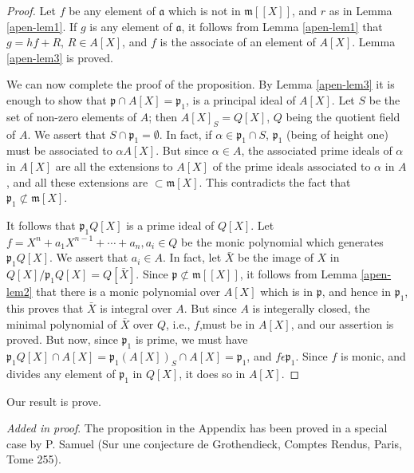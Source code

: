 \begin{proof}
Let $f$ be any element of $\mathfrak{a}$ which is not in $\mathfrak{m} [[X]]$, and $r$ as in Lemma \ref{apen-lem1}. If $g$ is any element of $\mathfrak{a}$, it follows from Lemma \ref{apen-lem1} that $g = hf+R$, $R \in A [X]$, and $f$ is the associate of an element of $A[X]$. Lemma \ref{apen-lem3} is proved.

We can now complete the proof of the proposition. By Lemma \ref{apen-lem3} it is enough to show that $\mathfrak{p} \cap A [X] = \mathfrak{p}_1$, is a principal ideal of $A[X]$. Let $S$ be the set of non-zero elements of $A$; then $A [X]_S = Q [X]$, $Q$ being the quotient field of $A$. We assert that $S \cap \mathfrak{p}_1 = \emptyset$. In fact, if $\alpha\in \mathfrak{p}_1 \cap S$, $\mathfrak{p}_1$ (being of height one) must be associated to $\alpha A [X]$. But since $\alpha \in A$, the associated prime ideals of $\alpha$ in $A [X]$ are all the extensions to $A[X]$ of the prime ideals associated to $\alpha$ in $A$, and all these extensions are $\subset \mathfrak{m}[X]$. This contradicts the fact that $\mathfrak{p}_1 \not\subset \mathfrak{m}[X]$. 

It follows that $\mathfrak{p}_1 Q [X]$ is a prime ideal of $Q[X]$. Let $f= X^n + a_1 X^{n-1} + \cdots + a_n, a_i \in Q$ be the monic polynomial which generates $\mathfrak{p}_1 Q [X]$. We assert that $a_i \in A$. In fact, let $\bar{X}$ be the image of $X$ in $Q [X]/ \mathfrak{p}_1 Q [X] = Q [\bar{X}]$. Since $\mathfrak{p} \not\subset \mathfrak{m}[[X]]$, it follows from Lemma \ref{apen-lem2} that there is a monic polynomial over $A[X]$ which is in $\mathfrak{p}$, and hence in $\mathfrak{p}_1$, this proves that $\bar{X}$ is integral over $A$. But since $A$ is integerally closed, the minimal polynomial of $\bar{X}$ over $Q$, i.e., $f$,\pageoriginale must be in $A[X]$, and our assertion is proved. But now, since $\mathfrak{p}_1$ is prime, we must have $\mathfrak{p}_1 Q [X] \cap A [X] = \mathfrak{p}_1 (A [X])_S \cap A [X]= \mathfrak{p}_1$, and $f \epsilon \mathfrak{p}_1$. Since $f$ is monic, and divides any element of $\mathfrak{p}_1$ in $Q[X]$, it does so in $A [X]$.
\end{proof}

Our result is prove.

{\em Added in proof}. The proposition in the Appendix has been proved in a special case by P. Samuel (Sur une conjecture de Grothendieck, Comptes Rendus, Paris, Tome 255).


